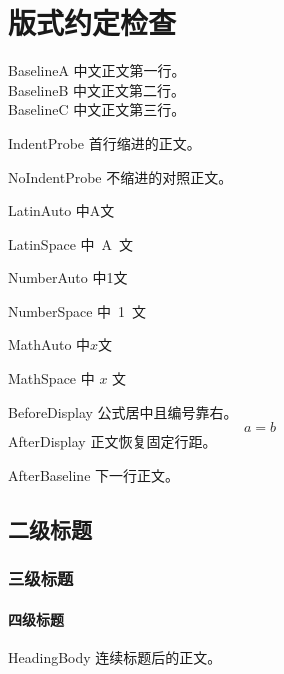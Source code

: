 \documentclass{uestcthesis}
\begin{document}
\uestcmainmatter
\chapter{版式约定检查}

\noindent BaselineA 中文正文第一行。\\
BaselineB 中文正文第二行。\\
BaselineC 中文正文第三行。

IndentProbe 首行缩进的正文。

\noindent NoIndentProbe 不缩进的对照正文。

\noindent LatinAuto \quad\mbox{中A文}

\noindent LatinSpace \quad\mbox{中 A 文}

\noindent NumberAuto \quad\mbox{中1文}

\noindent NumberSpace \quad\mbox{中 1 文}

\noindent MathAuto \quad 中$x$文

\noindent MathSpace \quad 中 $x$ 文

\noindent BeforeDisplay 公式居中且编号靠右。
\begin{equation}
    a=b
\end{equation}
\noindent AfterDisplay 正文恢复固定行距。

\noindent AfterBaseline 下一行正文。

\section{二级标题}
\subsection{三级标题}
\subsubsection{四级标题}
\noindent HeadingBody 连续标题后的正文。
\end{document}
